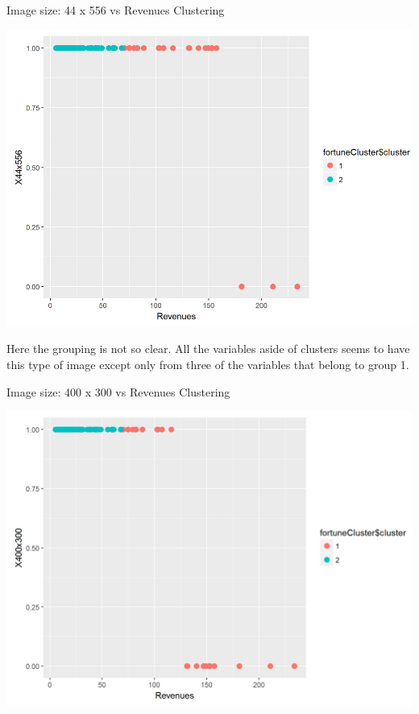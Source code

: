 \documentclass{book}
\begin{document}
\begin{table}[H]
\centering
\caption{Image size: 44 x 556 vs Revenues Clustering}
\begin{center}
\includegraphics[scale=0.5]{../R/photos/97_clust_44.png}   \\
\end{center}
\end{table}
Here the grouping is not so clear. All the variables aside of clusters seems to have this type of image except only from three of the variables that belong to group 1.
\begin{table}[H]
\centering
\caption{Image size: 400 x 300 vs Revenues Clustering}
\begin{center}
\includegraphics[scale=0.5]{../R/photos/98_clust_400.png}   \\
\end{center}
\end{table}
\end{document}
